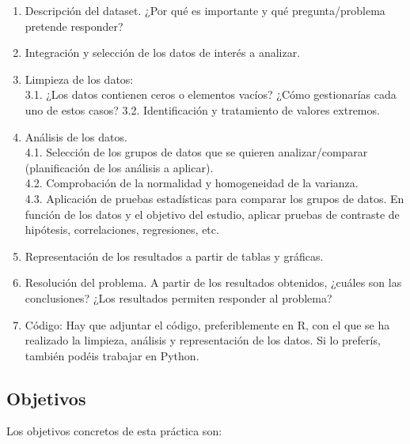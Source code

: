 \documentclass[]{article}
\providecommand{\tightlist}{%
  \setlength{\itemsep}{0pt}\setlength{\parskip}{0pt}}
\begin{document}
\begin{enumerate}
\def\labelenumi{\arabic{enumi}.}
\tightlist
\item
  Descripción del dataset. ¿Por qué es importante y qué
  pregunta/problema pretende responder?
\item
  Integración y selección de los datos de interés a analizar.
\item
  Limpieza de los datos:\\
  3.1. ¿Los datos contienen ceros o elementos vacíos? ¿Cómo gestionarías
  cada uno de estos casos? 3.2. Identificación y tratamiento de valores
  extremos.
\item
  Análisis de los datos.\\
  4.1. Selección de los grupos de datos que se quieren analizar/comparar
  (planificación de los análisis a aplicar).\\
  4.2. Comprobación de la normalidad y homogeneidad de la varianza.\\
  4.3. Aplicación de pruebas estadísticas para comparar los grupos de
  datos. En función de los datos y el objetivo del estudio, aplicar
  pruebas de contraste de hipótesis, correlaciones, regresiones, etc.
\item
  Representación de los resultados a partir de tablas y gráficas.
\item
  Resolución del problema. A partir de los resultados obtenidos, ¿cuáles
  son las conclusiones? ¿Los resultados permiten responder al problema?
\item
  Código: Hay que adjuntar el código, preferiblemente en R, con el que
  se ha realizado la limpieza, análisis y representación de los datos.
  Si lo preferís, también podéis trabajar en Python.
\end{enumerate}

\subsection{Objetivos}\label{objetivos}

Los objetivos concretos de esta práctica son:
\end{document}
